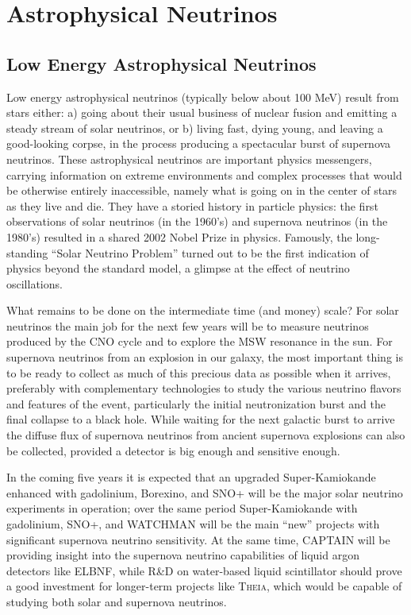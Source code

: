 \section{Astrophysical Neutrinos}
\label{sec:Astrophysical}

\subsection{Low Energy Astrophysical Neutrinos}
\label{sec:Astrophysical_low}

Low energy astrophysical neutrinos (typically below about 100 MeV)
result from stars either: a) going about their usual business of
nuclear fusion and emitting a steady stream of solar neutrinos, or b)
living fast, dying young, and leaving a good-looking corpse, in the
process producing a spectacular burst of supernova neutrinos. These
astrophysical neutrinos are important physics messengers, carrying
information on extreme environments and complex processes that would
be otherwise entirely inaccessible, namely what is going on in the
center of stars as they live and die. They have a storied history in
particle physics: the first observations of solar neutrinos (in the
1960's) and supernova neutrinos (in the 1980's) resulted in a shared
2002 Nobel Prize in physics. Famously, the long-standing ``Solar
Neutrino Problem'' turned out to be the first indication of physics
beyond the standard model, a glimpse at the effect of neutrino
oscillations.

What remains to be done on the intermediate time (and money) scale?
For solar neutrinos the main job for the next few years will be to
measure neutrinos produced by the CNO cycle and to explore the MSW
resonance in the sun. For supernova neutrinos from an explosion in our
galaxy, the most important thing is to be ready to collect as much of
this precious data as possible when it arrives, preferably with
complementary technologies to study the various neutrino flavors
and features of the event, particularly the initial neutronization
burst and the final collapse to a black hole. While waiting for the
next galactic burst to arrive the diffuse flux of supernova neutrinos
from ancient supernova explosions can also be collected, provided a
detector is big enough and sensitive enough.

In the coming five years it is expected that an upgraded
Super-Kamiokande enhanced with gadolinium, Borexino, and SNO+ will be
the major solar neutrino experiments in operation; over the same
period Super-Kamiokande with gadolinium, SNO+, and WATCHMAN will be
the main ``new'' projects with significant supernova neutrino
sensitivity. At the same time, CAPTAIN will be providing insight into
the supernova neutrino capabilities of liquid argon detectors like
ELBNF, while R\&D on water-based liquid scintillator should prove a
good investment for longer-term projects like \textsc{Theia}, which would be
capable of studying both solar and supernova neutrinos.

